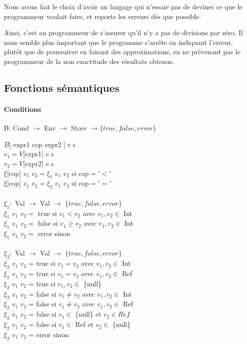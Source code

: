 	Nous avons fait le choix d'avoir un langage qui n'essaie pas de deviner ce que le programmeur
	voulait faire, et reporte les erreurs dès que possible. 

	Ainsi, c'est au programmeur de s'assurer qu'il n'y a pas de divisions par zéro. Il nous semble
	plus important que le programme s'arrête en indiquant l'erreur, plutôt que de poursuivre en
	faisant des approximations, en ne prévenant pas le programmeur de la non exactitude des résultats
	obtenus. 

\subsection{Fonctions sémantiques}
\paragraph{Conditions} B: Cond $\rightarrow$ Env $\rightarrow$ Store $\rightarrow \{true, false, error\}$

$B[$ expr1 cop expr2 $]$ e s\\
$v_1 = V[$expr1$]$ e s\\
$v_2 = V[$expr2$]$ e s\\
$\xi[$cop$]$ $v_1$ $v_2 = \xi_1$ $v_1$ $v_2$ si cop$= '<'$\\
$\xi[$cop$]$ $v_1$ $v_2 = \xi_2$ $v_1$ $v_2$ si cop$= '='$\\
\\
$\xi_1 :$ Val $\rightarrow$ Val $\rightarrow$ $\{true,false,error\}$\\
$\xi_1$ $v_1$ $v_2 = $ true si $v_1 < v_2$ avec $v_1,v_2 \in $ Int\\
$\xi_1$ $v_1$ $v_2 = $ false si $v_1 \geq v_2$ avec $v_1,v_2 \in $ Int\\
$\xi_1$ $v_1$ $v_2 = $ error sinon\\

\\
$\xi_2 :$ Val $\rightarrow$ Val $\rightarrow$ $\{true,false,error\}$\\
$\xi_2$ $v_1$ $v_2$ =  true si $v_1 = v_2$ avec $v_1,v_2 \in $ Int\\
$\xi_2$ $v_1$ $v_2$ =  true si $v_1 = v_2$ avec $v_1,v_2 \in $ Ref\\
$\xi_2$ $v_1$ $v_2$ =  true si $v_1,v_2 \in $ \{null\} \\
$\xi_2$ $v_1$ $v_2$ =  false si $v_1 \neq v_2$ avec $v_1,v_2 \in $ Int\\
$\xi_2$ $v_1$ $v_2$ =  false si $v_1 \neq v_2$ avec $v_1,v_2 \in $ Ref\\
$\xi_2$ $v_1$ $v_2$ =  false si $v_1  \in $ \{null\} et $v_2 \in Ref$\\
$\xi_2$ $v_1$ $v_2$ =  false si $v_1  \in $ Ref et $v_2 \in $ \{null\}\\
$\xi_2$ $v_1$ $v_2$ =  error sinon\\

